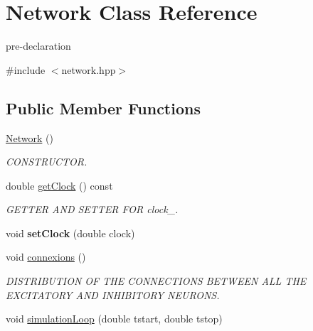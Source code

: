 \hypertarget{classNetwork}{\section{Network Class Reference}
\label{classNetwork}
}


pre-\/declaration  




{\ttfamily \#include $<$network.\-hpp$>$}

\subsection*{Public Member Functions}
\begin{DoxyCompactItemize}
\item 
\hypertarget{classNetwork_a3cc2fb4f8fa4d507077e8da85ce5a1c8}{\hyperlink{classNetwork_a3cc2fb4f8fa4d507077e8da85ce5a1c8}{Network} ()}\label{classNetwork_a3cc2fb4f8fa4d507077e8da85ce5a1c8}

\begin{DoxyCompactList}\small\item\em C\-O\-N\-S\-T\-R\-U\-C\-T\-O\-R. \end{DoxyCompactList}\item 
\hypertarget{classNetwork_a5267a0830b3b3f028fd7bac798a6d170}{double \hyperlink{classNetwork_a5267a0830b3b3f028fd7bac798a6d170}{get\-Clock} () const }\label{classNetwork_a5267a0830b3b3f028fd7bac798a6d170}

\begin{DoxyCompactList}\small\item\em G\-E\-T\-T\-E\-R A\-N\-D S\-E\-T\-T\-E\-R F\-O\-R clock\-\_\-. \end{DoxyCompactList}\item 
\hypertarget{classNetwork_a9c64fa8300e495fd23b5cdd6e6bc45e1}{void {\bfseries set\-Clock} (double clock)}\label{classNetwork_a9c64fa8300e495fd23b5cdd6e6bc45e1}

\item 
\hypertarget{classNetwork_aa3d02e11008f871c56272cf3bcee21ea}{void \hyperlink{classNetwork_aa3d02e11008f871c56272cf3bcee21ea}{connexions} ()}\label{classNetwork_aa3d02e11008f871c56272cf3bcee21ea}

\begin{DoxyCompactList}\small\item\em D\-I\-S\-T\-R\-I\-B\-U\-T\-I\-O\-N O\-F T\-H\-E C\-O\-N\-N\-E\-C\-T\-I\-O\-N\-S B\-E\-T\-W\-E\-E\-N A\-L\-L T\-H\-E E\-X\-C\-I\-T\-A\-T\-O\-R\-Y A\-N\-D I\-N\-H\-I\-B\-I\-T\-O\-R\-Y N\-E\-U\-R\-O\-N\-S. \end{DoxyCompactList}\item 
\hypertarget{classNetwork_a4d13d3615f9e5c72ef685cef667688ab}{void \hyperlink{classNetwork_a4d13d3615f9e5c72ef685cef667688ab}{simulation\-Loop} (double tstart, double tstop)}\label{classNetwork_a4d13d3615f9e5c72ef685cef667688ab}


\end{DoxyCompactItemize}
